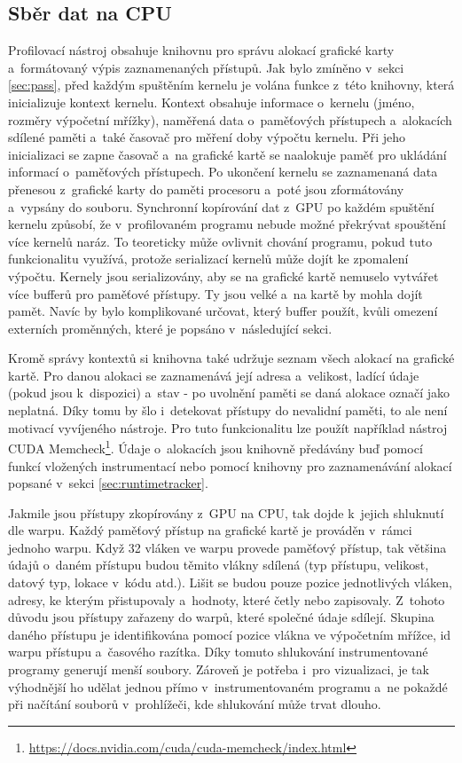 \subsection{Sběr dat na CPU}
\label{sec:cpucollection}
Profilovací nástroj obsahuje knihovnu pro správu alokací grafické karty a~formátovaný výpis zaznamenaných přístupů. Jak bylo zmíněno v~sekci \ref{sec:pass}, před každým spuštěním kernelu je volána funkce z~této knihovny, která inicializuje kontext kernelu. Kontext obsahuje informace o~kernelu (jméno, rozměry výpočetní mřížky), naměřená data o~paměťových přístupech a~alokacích sdílené paměti a~také časovač pro měření doby výpočtu kernelu. Při jeho inicializaci se zapne časovač a~na grafické kartě se naalokuje paměť pro ukládání informací o~paměťových přístupech. Po ukončení kernelu se zaznamenaná data přenesou z~grafické karty do paměti procesoru a~poté jsou zformátovány a~vypsány do souboru. 
Synchronní kopírování dat z~GPU po každém spuštění kernelu způsobí, že v~profilovaném programu nebude možné překrývat spouštění více kernelů naráz. To teoreticky může ovlivnit chování programu, pokud tuto funkcionalitu využívá, protože serializací kernelů může dojít ke zpomalení výpočtu. Kernely jsou serializovány, aby se na grafické kartě nemuselo vytvářet více bufferů pro paměťové přístupy. Ty jsou velké a~na kartě by mohla dojít pamět. Navíc by bylo komplikované určovat, který buffer použít, kvůli omezení externích proměnných, které je popsáno v~následující sekci.

Kromě správy kontextů si knihovna také udržuje seznam všech alokací na grafické kartě. Pro danou alokaci se zaznamenává její adresa a~velikost, ladící údaje (pokud jsou k~dispozici) a~stav - po uvolnění paměti se daná alokace označí jako neplatná. Díky tomu by šlo i~detekovat přístupy do nevalidní paměti, to ale není motivací vyvíjeného nástroje. Pro tuto funkcionalitu lze použít například nástroj CUDA Memcheck\footnote{\url{https://docs.nvidia.com/cuda/cuda-memcheck/index.html}}. Údaje o~alokacích jsou knihovně předávány buď pomocí funkcí vložených instrumentací nebo pomocí knihovny pro zaznamenávání alokací popsané v~sekci \ref{sec:runtimetracker}.

Jakmile jsou přístupy zkopírovány z~GPU na CPU, tak dojde k~jejich shluknutí dle warpu. Každý paměťový přístup na grafické kartě je prováděn v~rámci jednoho warpu. Když 32 vláken ve warpu provede paměťový přístup, tak většina údajů o~daném přístupu budou těmito vlákny sdílená (typ přístupu, velikost, datový typ, lokace v~kódu atd.). Lišit se budou pouze pozice jednotlivých vláken, adresy, ke kterým přistupovaly a~hodnoty, které četly nebo zapisovaly. Z~tohoto důvodu jsou přístupy zařazeny do warpů, které společné údaje sdílejí. Skupina daného přístupu je identifikována pomocí pozice vlákna ve výpočetním mřížce, id warpu přístupu a~časového razítka. Díky tomuto shlukování instrumentované programy generují menší soubory. Zároveň je potřeba i~pro vizualizaci, je tak výhodnější ho udělat jednou přímo v~instrumentovaném programu a~ne pokaždé při načítání souborů v~prohlížeči, kde shlukování může trvat dlouho.

